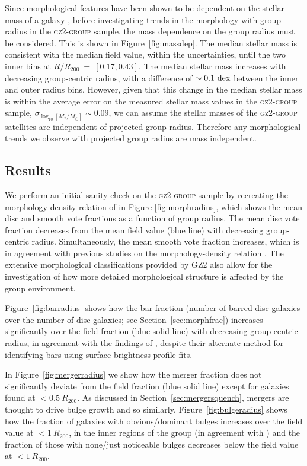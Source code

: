 \documentclass[useAMS,usenatbib]{mn2e}
\begin{document}
Since morphological features have been shown to be dependent on the stellar mass of a galaxy \citep[e.g. the increase in the bar fraction with stellar mass; see][]{nair10, skibba12}, before investigating trends in the morphology with group radius in the \textsc{gz2-group} sample, the mass dependence on the group radius must be considered. This is shown in Figure~\ref{fig:massdep}. The median stellar mass is consistent with the median field value, within the uncertainties, until the two inner bins at $R/R_{200}~=~[0.17, 0.43]$. The median stellar mass increases with decreasing group-centric radius, with a difference of $\sim0.1~\rm{dex}$ between the inner and outer radius bins. However, given that this change in the median stellar mass is within the average error on the measured stellar mass values in the \textsc{gz2-group} sample, $\sigma_{\log_{10}[M_*/M_{\odot}]}\sim 0.09$, we can assume the stellar masses of the \textsc{gz2-group} satellites are independent of projected group radius. Therefore any morphological trends we observe with projected group radius are mass independent.

\subsection{Results}

We perform an initial sanity check on the \textsc{gz2-group} sample by recreating the morphology-density relation of \citet{dressler80} in Figure \ref{fig:morphradius}, which shows the mean disc and smooth vote fractions as a function of group radius. The mean disc vote fraction decreases from the mean field value (blue line) with decreasing group-centric radius. Simultaneously, the mean smooth vote fraction increases, which is in agreement with previous studies on the morphology-density relation \citep{dressler80, smail97, poggianti99, postman05, Bamford09}. The extensive morphological classifications provided by GZ2 also allow for the investigation of how more detailed morphological structure is affected by the group environment.  

Figure~\ref{fig:barradius} shows how the bar fraction (number of barred disc galaxies over the number of disc galaxies; see Section~\ref{sec:morphfrac}) increases significantly over the field fraction (blue solid line) with decreasing group-centric radius, in agreement with the findings of \cite{barazza09}, despite their alternate method for identifying bars using surface brightness profile fits. 

In Figure~\ref{fig:mergerradius} we show how the merger fraction does not significantly deviate from the field fraction (blue solid line) except for galaxies found at $< 0.5~R_{200}$. As discussed in Section~\ref{sec:mergersquench}, mergers are thought to drive bulge growth and so similarly, Figure~\ref{fig:bulgeradius} shows how the fraction of galaxies with obvious/dominant bulges increases over the field value at $< 1~R_{200}$, in the inner regions of the group (in agreement with \citealt{diaferio01}) and the fraction of those with none/just noticeable bulges decreases below the field value at $< 1~R_{200}$. 
\end{document}
